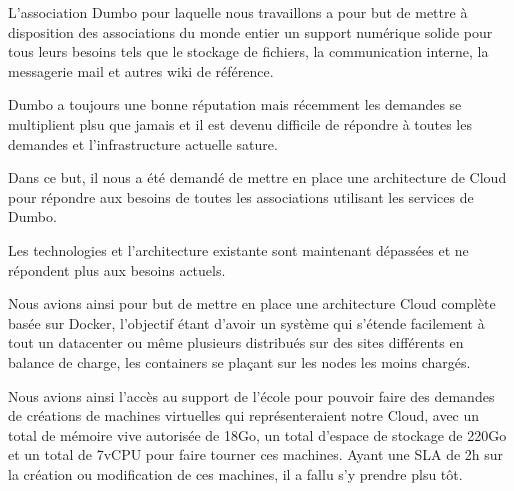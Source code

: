 L'association Dumbo pour laquelle nous travaillons a pour but de mettre à disposition des associations du monde entier un support numérique solide pour tous leurs besoins tels que le stockage de fichiers, la communication interne, la messagerie mail et autres wiki de référence.

Dumbo a toujours une bonne réputation mais récemment les demandes se multiplient plsu que jamais et il est devenu difficile de répondre à toutes les demandes et l'infrastructure actuelle sature.

Dans ce but, il nous a été demandé de mettre en place une architecture de Cloud pour répondre aux besoins de toutes les associations utilisant les services de Dumbo.

Les technologies et l'architecture existante sont maintenant dépassées et ne répondent plus aux besoins actuels.

Nous avions ainsi pour but de mettre en place une architecture Cloud complète basée sur Docker, l'objectif étant d'avoir un système qui s'étende facilement à tout un datacenter ou même plusieurs distribués sur des sites différents en balance de charge, les containers se plaçant sur les nodes les moins chargés.

Nous avions ainsi l'accès au support de l'école pour pouvoir faire des demandes de créations de machines virtuelles qui représenteraient notre Cloud, avec un total de mémoire vive autorisée de 18Go, un total d'espace de stockage de 220Go et un total de 7vCPU pour faire tourner ces machines. Ayant une SLA de 2h sur la création ou modification de ces machines, il a fallu s'y prendre plsu tôt.

